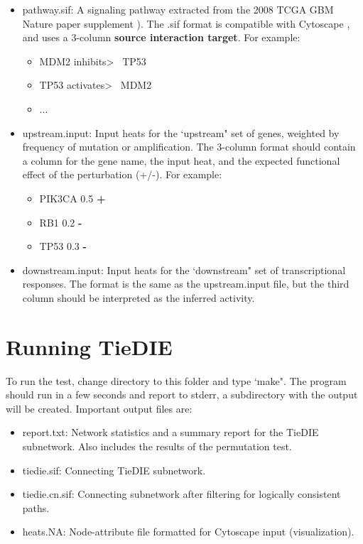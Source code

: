 \documentclass[11pt]{report}
\begin{document}
	\begin{itemize}
	\item pathway.sif: A signaling pathway extracted from the 2008 TCGA GBM Nature paper supplement \cite{TCGA08}). The .sif format is
	compatible with Cytoscape \cite{Cytoscape}, and uses a 3-column \textbf{source interaction target}. For example: 
	\begin{itemize}	
	
		\item MDM2	inhibits\textgreater	~ TP53
		\item TP53	activates\textgreater	~ MDM2
		\item ...
	\end{itemize}
	
	\item upstream.input: Input heats for the `upstream" set of genes, weighted by frequency of mutation or amplification. The 3-column format
	should contain a column for the gene name, the input heat, and the expected functional effect of the perturbation (+/-). For example:
	\begin{itemize}	
		\item PIK3CA	0.5	\textbf{+}
		\item RB1	0.2	 \textbf{-}
		\item TP53 0.3   \textbf{-}
	\end{itemize}	
	\item downstream.input: Input heats for the `downstream" set of transcriptional responses. The format is the same as the upstream.input file,
	but the third column should be interpreted as the inferred activity. 

	\end{itemize}

\section{Running TieDIE}

\noindent To run the test, change directory to this folder and type `make". The program should run in a few seconds and report 
to stderr, a subdirectory with the output will be created. Important output files are:

	\begin{itemize}
	\item report.txt: Network statistics and a summary report for the TieDIE subnetwork. Also includes the results of the 
	permutation test. 
	\item tiedie.sif: Connecting TieDIE subnetwork.
	\item tiedie.cn.sif: Connecting subnetwork after filtering for logically consistent paths. 
	\item heats.NA: Node-attribute file formatted for Cytoscape input (visualization). 
	\end{itemize}
\end{document}
